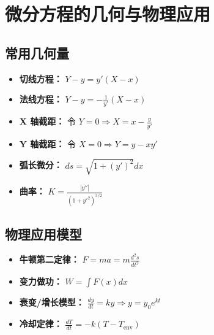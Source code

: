 \documentclass[a4paper,12pt]{ctexart}
\begin{document}
\section{微分方程的几何与物理应用}

\subsection{常用几何量}
\begin{itemize}
    \item \textbf{切线方程：} $Y - y = y'(X - x)$
    \item \textbf{法线方程：} $Y - y = -\frac{1}{y'}(X - x)$
    \item \textbf{X 轴截距：} 令 $Y=0 \Rightarrow X = x - \frac{y}{y'}$
    \item \textbf{Y 轴截距：} 令 $X=0 \Rightarrow Y = y - x y'$
    \item \textbf{弧长微分：} $ds = \sqrt{1 + (y')^2} dx$
    \item \textbf{曲率：} $K = \frac{|y''|}{(1 + y'^2)^{3/2}}$
\end{itemize}

\subsection{物理应用模型}
\begin{itemize}
    \item \textbf{牛顿第二定律：} $F = ma = m \frac{d^2s}{dt^2}$
    \item \textbf{变力做功：} $W = \int F(x) dx$
    \item \textbf{衰变/增长模型：} $\frac{dy}{dt} = ky \Rightarrow y = y_0 e^{kt}$
    \item \textbf{冷却定律：} $\frac{dT}{dt} = -k(T - T_{\text{env}})$
\end{itemize}
\end{document}
